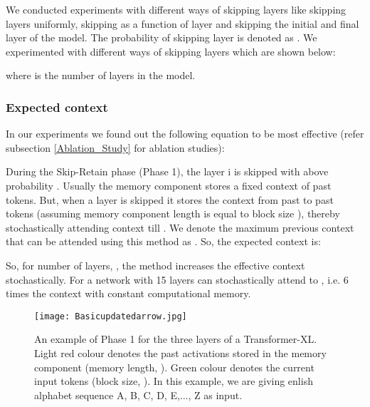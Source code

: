\documentclass[11pt]{article}
\begin{document}
We conducted experiments with different ways of skipping layers like skipping layers uniformly, skipping as a function of layer and skipping the initial and final layer of the model. The probability of skipping  layer is denoted as . We experimented with different ways of skipping layers which are shown below:












where  is the number of layers in the model. 



\subsubsection{Expected context}
\label{subsec:expected_context}

In our experiments we found out the following equation to be most effective (refer subsection \ref{Ablation_Study} for ablation studies):


During the Skip-Retain phase (Phase 1), the layer i is skipped with above probability . Usually the memory component stores a fixed context of   past tokens. But, when a layer is skipped it stores the context from past  to  past tokens (assuming memory component length  is equal to block size ), thereby  stochastically attending context  till . We denote the maximum previous context that can be attended using this method as . So, the expected context is:





So, for number of layers,  , the method increases the effective context stochastically. For a network with  15 layers can stochastically attend to , i.e. 6 times the context with constant computational memory.







\begin{figure}
\hspace{\fill}
\centering
\texttt{[image: Basicupdatedarrow.jpg]}
      \caption{An example of Phase 1 for the three layers of a Transformer-XL. Light red colour denotes the past activations stored in the memory component (memory length, ). Green colour denotes the current input tokens (block size, ). In this example, we are giving enlish alphabet sequence A, B, C, D, E,..., Z as input. }
    
    
    \label{fig:fig1}
\end{figure}
\end{document}
